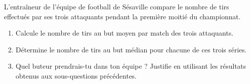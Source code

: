 %
%
    L'entraîneur de l'équipe de football de Sésaville compare le nombre de tirs effectués par ses
    trois attaquants pendant la première moitié du championnat.
    \begin{center}
        \pgfplotsset{width=.5\linewidth}
        
        
        
    \end{center}

    \begin{enumerate}
        \item Calcule le nombre de tirs au but moyen par match des trois attaquants.
        \item  Détermine le nombre de tirs au but médian pour chacune de ces trois séries.
        \item Quel buteur prendrais-tu dans ton équipe ? Justifie en utilisant les résultats obtenus aux sous-questions précédentes.
    \end{enumerate}
